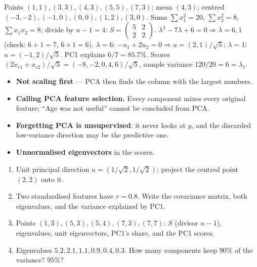 \documentclass[11pt]{article}
\begin{document}
\begin{worked}
Points $(1,1), (3,3), (4,3), (5,5), (7,3)$; mean $(4,3)$; centred
$(-3,-2), (-1,0), (0,0), (1,2), (3,0)$. Sums $\sum x_1^2 = 20$,
$\sum x_2^2 = 8$, $\sum x_1x_2 = 8$; divide by $n - 1 = 4$:
$S = \begin{pmatrix}5 & 2\\2 & 2\end{pmatrix}$.
$\lambda^2 - 7\lambda + 6 = 0 \Rightarrow \lambda = 6, 1$ (check: $6+1 = 7$,
$6 \times 1 = 6$). $\lambda = 6$: $-u_1 + 2u_2 = 0 \Rightarrow u =
(2,1)/\sqrt5$; $\lambda = 1$: $u = (-1,2)/\sqrt5$. PC1 explains $6/7 =
85.7\%$. Scores $(2x_{c1} + x_{c2})/\sqrt5 = (-8,-2,0,4,6)/\sqrt5$, sample
variance $120/20 = 6 = \lambda_1$.
\end{worked}

\begin{caution}
\begin{itemize}
  \item \textbf{Not scaling first} --- PCA then finds the column with the
    largest numbers.
  \item \textbf{Calling PCA feature selection.} Every component mixes every
    original feature; ``Age was not useful'' cannot be concluded from PCA.
  \item \textbf{Forgetting PCA is unsupervised}: it never looks at $y$, and
    the discarded low-variance direction may be the predictive one.
  \item \textbf{Unnormalised eigenvectors} in the scores.
\end{itemize}
\end{caution}

\begin{tryit}
\begin{enumerate}[label=\textbf{E13.\arabic*}]
  \item Unit principal direction $u = (1/\sqrt2, 1/\sqrt2)$; project the centred
    point $(2, 2)$ onto it.
  \item Two standardised features have $r = 0.8$. Write the covariance matrix,
    both eigenvalues, and the variance explained by PC1.
  \item Points $(1,3), (5,3), (5,4), (7,3), (7,7)$: $S$ (divisor $n-1$),
    eigenvalues, unit eigenvectors, PC1's share, and the PC1 scores.
  \item Eigenvalues $5.2, 2.1, 1.1, 0.9, 0.4, 0.3$. How many components keep
    $90\%$ of the variance? $95\%$?
\end{enumerate}
\end{tryit}
\end{document}

